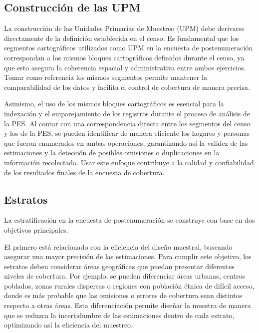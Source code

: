 \documentclass[
  12pt,
]{book}
\begin{document}
\subsection{Construcción de las UPM}\label{construcciuxf3n-de-las-upm}

La construcción de las Unidades Primarias de Muestreo (UPM) debe derivarse directamente de la definición establecida en el censo. Es fundamental que los segmentos cartográficos utilizados como UPM en la encuesta de postenumeración correspondan a los mismos bloques cartográficos definidos durante el censo, ya que esto asegura la coherencia espacial y administrativa entre ambos ejercicios. Tomar como referencia los mismos segmentos permite mantener la comparabilidad de los datos y facilita el control de cobertura de manera precisa.

Asimismo, el uso de los mismos bloques cartográficos es esencial para la indexación y el emparejamiento de los registros durante el proceso de análisis de la PES. Al contar con una correspondencia directa entre los segmentos del censo y los de la PES, se pueden identificar de manera eficiente los hogares y personas que fueron enumerados en ambas operaciones, garantizando así la validez de las estimaciones y la detección de posibles omisiones o duplicaciones en la información recolectada. Usar este enfoque contribuye a la calidad y confiabilidad de los resultados finales de la encuesta de cobertura.

\subsection{Estratos}\label{estratos}

La estratificación en la encuesta de postenumeración se construye con base en dos objetivos principales.

El primero está relacionado con la eficiencia del diseño muestral, buscando asegurar una mayor precisión de las estimaciones. Para cumplir este objetivo, los estratos deben considerar áreas geográficas que puedan presentar diferentes niveles de cobertura. Por ejemplo, se pueden diferenciar áreas urbanas, centros poblados, zonas rurales dispersas o regiones con población étnica de difícil acceso, donde es más probable que las omisiones o errores de cobertura sean distintos respecto a otras áreas. Esta diferenciación permite diseñar la muestra de manera que se reduzca la incertidumbre de las estimaciones dentro de cada estrato, optimizando así la eficiencia del muestreo.
\end{document}
